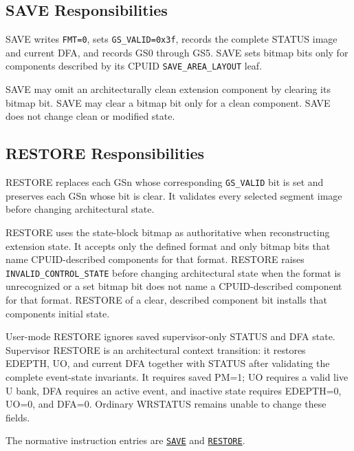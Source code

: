 \subsection{SAVE Responsibilities}
SAVE writes \texttt{FMT=0}, sets \texttt{GS\_VALID=0x3f}, records the complete STATUS image and current DFA, and records GS0 through GS5. SAVE sets bitmap bits only
for components described by its CPUID \texttt{SAVE\_AREA\_LAYOUT} leaf.

SAVE may omit an architecturally clean extension component by clearing its bitmap bit. SAVE may clear a bitmap bit
only for a clean component. SAVE does not change clean or modified state.

\subsection{RESTORE Responsibilities}
RESTORE replaces each GSn whose corresponding \texttt{GS\_VALID} bit is set and preserves each GSn whose bit is
clear. It validates every selected segment image before changing architectural state.

RESTORE uses the state-block bitmap as authoritative when reconstructing extension state. It accepts only the
defined format and only bitmap bits that name CPUID-described components for that format. RESTORE raises
\texttt{INVALID\_CONTROL\_STATE} before changing architectural state when the format is unrecognized or a set
bitmap bit does not name a CPUID-described component for that format. RESTORE of a clear, described component bit
installs that component\textquotesingle{}s initial state.

User-mode RESTORE ignores saved supervisor-only STATUS and DFA state. Supervisor RESTORE is an architectural
context transition: it restores EDEPTH, UO, and current DFA together with STATUS after validating the complete
event-state invariants. It requires saved PM=1; UO requires a valid live U bank, DFA requires an active event, and
inactive state requires EDEPTH=0, UO=0, and DFA=0. Ordinary WRSTATUS remains unable to change these fields.

The normative instruction entries are
\hyperref[instr:save]{\texttt{SAVE}} and
\hyperref[instr:restore]{\texttt{RESTORE}}.\par
